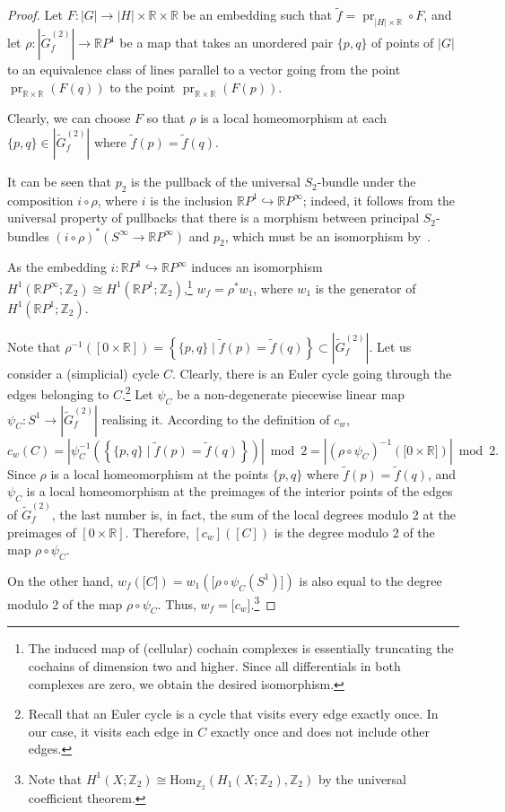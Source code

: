 \documentclass[a4paper,12pt,reqno,oneside]{amsart}
\theoremstyle{plain}
\theoremstyle{definition}
\theoremstyle{plain}
\newcommand{\from}{\colon}
\newcommand{\wt}[1]{\widetilde{#1}}
\newcommand{\R}{\mathbb{R}}
\newcommand{\RP}{\mathbb{R}P}
\newcommand{\Z}{\mathbb{Z}}
\DeclareMathOperator{\pr}{pr}
\begin{document}
\begin{proof}
  Let $F \from |G| \to |H| \times \R \times \R$ be an embedding such that
  $\wt{f} = \pr_{|H| \times \R} \circ F$, and let $\rho \from |\wt{G}^{(2)}_f| \to \RP^1$ be a map
  that takes an unordered pair $\{p, q\}$ of points of $|G|$ to an equivalence class of lines
  parallel to a vector going from the point $\pr_{\R \times \R}(F(q))$ to the point
  $\pr_{\R \times \R}(F(p))$.

  Clearly, we can choose $F$ so that $\rho$ is a local homeomorphism at each
  $\{p, q\} \in |\wt{G}^{(2)}_f|$ where $\wt{f}(p) = \wt{f}(q)$.

  It can be seen that $p_2$ is the pullback of the universal $S_2$-bundle under the composition
  $i \circ \rho$, where $i$ is the inclusion $\RP^1 \hookrightarrow \RP^\infty$; indeed, it follows
  from the universal property of pullbacks that there is a morphism between principal $S_2$-bundles
  $(i \circ \rho)^* (S^\infty \to \RP^\infty)$ and $p_2$, which must be an isomorphism by~\cite[Proposition
  2.1]{principal_bundles}.

  As the embedding $i \from \RP^1 \hookrightarrow \RP^\infty$ induces an isomorphism
  $H^1(\RP^\infty; \Z_2) \cong H^1(\RP^1; \Z_2)$,\footnote{The induced map of (cellular) cochain
    complexes is essentially truncating the cochains of dimension two and higher. Since all
    differentials in both complexes are zero, we obtain the desired isomorphism.}
  $w_f = \rho^* w_1$, where $w_1$ is the generator of $H^1(\RP^1; \Z_2)$.

  Note that
  $\rho^{-1}([0 \times \R]) = \left\{\{p, q\} \mid \wt{f}(p) = \wt{f}(q)\right\} \subset
  |\wt{G}^{(2)}_f|$.  Let us consider a (simplicial) cycle $C$. Clearly, there is an Euler cycle
  going through the edges belonging to $C$.\footnote{Recall that an Euler cycle is a cycle that
    visits every edge exactly once. In our case, it visits each edge in $C$ exactly once and does
    not include other edges.} Let $\psi_{C}$ be a non-degenerate piecewise linear map
  $\psi_{C} \from S^{1} \to |\wt{G}^{(2)}_f|$ realising it. According to the definition of $c_{w}$,
  \[
    c_{w}(C) = \left|\psi_{C}^{-1}\left(\left\{\{p, q\} \mid \wt{f}(p) = \wt{f}(q)\right\}\right) \right| \bmod{2} = \left| (\rho
      \circ \psi_{C})^{-1}(\lbrack 0 \times \R \rbrack) \right| \bmod{2}.
  \]
  Since $\rho$ is a local homeomorphism at the points $\{p, q\}$ where $\wt{f}(p) = \wt{f}(q)$, and
  $\psi_{C}$ is a local homeomorphism at the preimages of the interior points of the edges of
  $\wt{G}^{(2)}_f$, the last number is, in fact, the sum of the local degrees modulo 2 at the
  preimages of $[0 \times \R]$. Therefore, $[c_{w}]([C])$ is the degree modulo 2 of the map
  $\rho \circ \psi_{C}$.

  On the other hand, $w_{f}(\lbrack C \rbrack) = w_{1}(\lbrack \rho \circ \psi_{C}(S^{1}) \rbrack)$
  is also equal to the degree modulo 2 of the map $\rho \circ \psi_{C}$. Thus,
  $w_{f} = \lbrack c_{w} \rbrack$.\footnote{Note that
    $H^{1}(X;\Z_{2}) \cong \mathrm{Hom}_{\Z_{2}}(H_{1}(X;\Z_{2}), \Z_{2})$ by the universal
    coefficient theorem.}
\end{proof}
\end{document}
